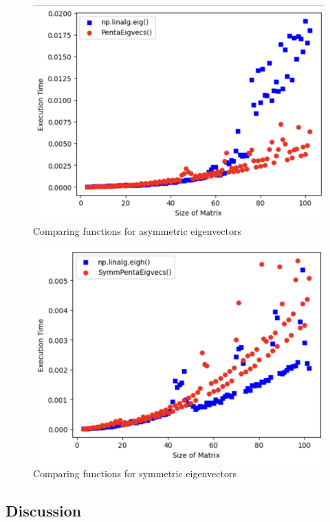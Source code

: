 \documentclass[10pt,twocolumn]{article}
\begin{document}
\begin{figure}[h!]
    \centering
    \includegraphics[scale=0.35]{avec.png}
    \caption{Comparing functions for asymmetric eigenvectors}
    \label{avec}
\end{figure}
\begin{figure}[h!]
    \centering
    \includegraphics[scale=0.35]{svec.png}
    \caption{Comparing functions for symmetric eigenvectors}
    \label{svec}
\end{figure}

\subsection{Discussion}
\end{document}
